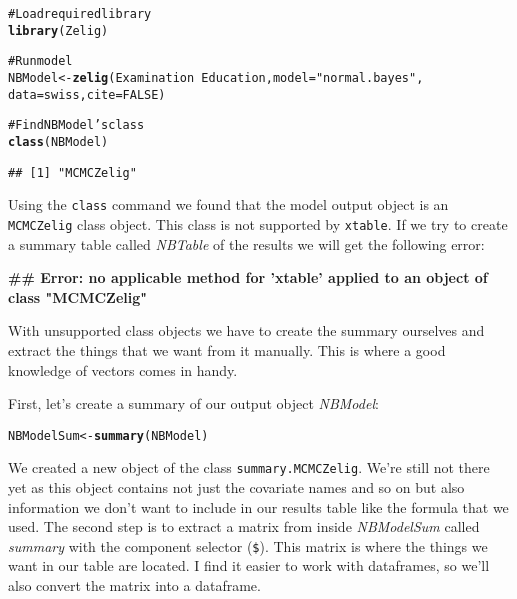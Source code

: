 \documentclass[ChapterTOCs,krantz1]{krantz}\usepackage{graphicx, color}
\makeatletter
\newcommand{\hlfunctioncall}[1]{\textcolor[rgb]{0.501960784313725,0,0.329411764705882}{\textbf{#1}}}%
\newcommand{\hlstring}[1]{\textcolor[rgb]{0.6,0.6,1}{#1}}%
\newcommand{\hlcomment}[1]{\textcolor[rgb]{0.180392156862745,0.6,0.341176470588235}{#1}}%
\newenvironment{kframe}{%
 \def\at@end@of@kframe{}%
 \ifinner\ifhmode%
  \def\at@end@of@kframe{\end{minipage}}%
  \begin{minipage}{\columnwidth}%
 \fi\fi%
 \def\FrameCommand##1{\hskip\@totalleftmargin \hskip-\fboxsep
 \colorbox{shadecolor}{##1}\hskip-\fboxsep
     \hskip-\linewidth \hskip-\@totalleftmargin \hskip\columnwidth}%
 \MakeFramed {\advance\hsize-\width
   \@totalleftmargin\z@ \linewidth\hsize
   \@setminipage}}%
 {\par\unskip\endMakeFramed%
 \at@end@of@kframe}
\newenvironment{knitrout}{}{} %
\makeatother
\begin{document}
\begin{knitrout}
\color{fgcolor}\begin{kframe}
\begin{alltt}
\hlcomment{# Load required library}
\hlfunctioncall{library}(Zelig)

\hlcomment{# Run model}
NBModel <- \hlfunctioncall{zelig}(Examination ~ Education, model = \hlstring{"normal.bayes"}, 
                    data = swiss, cite = FALSE)

\hlcomment{# Find NBModel's class}
\hlfunctioncall{class}(NBModel)
\end{alltt}
\begin{verbatim}
## [1] "MCMCZelig"
\end{verbatim}
\end{kframe}
\end{knitrout}


Using the {\tt{class}} command we found that the model output object is an {\tt{MCMCZelig}} class object. This class is not supported by {\tt{xtable}}. If we try to create a summary table called {\emph{NBTable}} of the results we will get the following error:

\begin{knitrout}
\color{fgcolor}\begin{kframe}


{\ttfamily\noindent\bfseries\textcolor{errorcolor}{\#\# Error: no applicable method for 'xtable' applied to an object of class "MCMCZelig"}}\end{kframe}
\end{knitrout}


With unsupported class objects we have to create the summary ourselves and extract the things that we want from it manually. This is where a good knowledge of vectors comes in handy. 

First, let's create a summary of our output object {\emph{NBModel}}:

\begin{knitrout}
\color{fgcolor}\begin{kframe}
\begin{alltt}
NBModelSum <- \hlfunctioncall{summary}(NBModel)
\end{alltt}
\end{kframe}
\end{knitrout}


We created a new object of the class {\tt{summary.MCMCZelig}}. We're still not there yet as this object contains not just the covariate names and so on but also information we don't want to include in our results table like the formula that we used. The second step is to extract a matrix from inside {\emph{NBModelSum}} called {\emph{summary}} with the component selector ({\tt{\$}}). This matrix is where the things we want in our table are located. I find it easier to work with dataframes, so we'll also convert the matrix into a dataframe.
\end{document}
